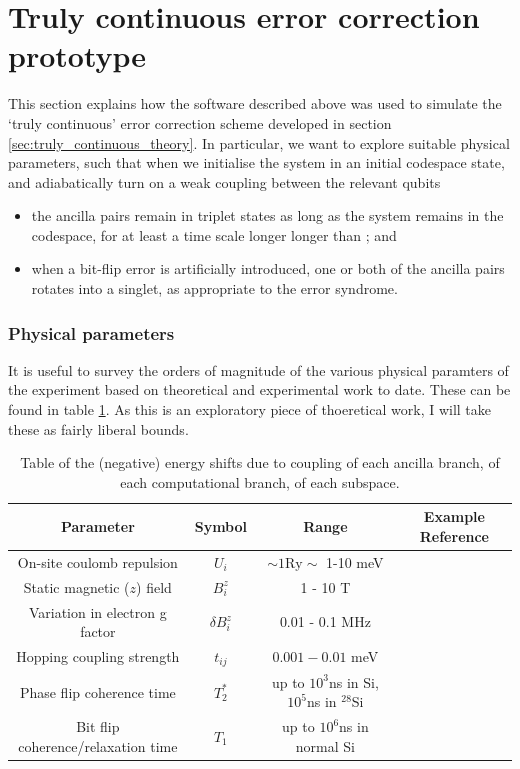 \documentclass{report}
\begin{document}
\section{Truly continuous error correction prototype}
This section explains how the software described above was used to simulate the `truly continuous' error correction scheme developed in section \ref{sec:truly_continuous_theory}. In particular, we want to explore suitable physical parameters, such that when we initialise the system in an initial codespace state, and adiabatically turn on a weak coupling between the relevant qubits
\begin{itemize}
    \item the ancilla pairs remain in triplet states as long as the system remains in the codespace, for at least a time scale longer longer than ; and
    \item when a bit-flip error is artificially introduced, one or both of the ancilla pairs rotates into a singlet, as appropriate to the error syndrome.
\end{itemize}

\subsubsection{Physical parameters}
It is useful to survey the orders of magnitude of the various physical paramters of the experiment based on theoretical and experimental work to date. These can be found in table \ref{table:parameters}. As this is an exploratory piece of thoeretical work, I will take these as fairly liberal bounds.

\begin{table}
    \centering
\begin{tabular}{|c|c|c|c|}
    \hline
    Parameter & Symbol & Range & Example Reference\\
    \hline
    On-site coulomb repulsion & $U_i$ & $\sim 1\mathrm{Ry} \sim$ 1-10 \unit{\milli\electronvolt} & \cite{Shim2022}\\
    \hline 
    Static magnetic ($z$) field & $B_i^z$ & 1 - 10 \unit{\tesla} & \cite{Jock2018} \\
    \hline
    Variation in electron g factor & $\delta B_i^z$ &0.01 - 0.1 \unit{\mega\hertz} &\cite{Hwang2017} \\
    \hline
    Hopping coupling strength & $t_{ij}$ &$0.001 - 0.01$ \unit{\milli\electronvolt} & \cite{Veldhorst2015} \\
    \hline
    Phase flip coherence time &$ T_2^*$ & up to $10^3$\unit{\nano\second} in Si, $10^5$\unit{\nano\second} in $^{28}$Si & \cite{Loss2022}\\
    \hline
    Bit flip coherence/relaxation time &$T_1$&up to $10^6$\unit{\nano\second} in normal Si& \cite{Loss2022}\\
    \hline

\end{tabular}
\caption{Table of the (negative) energy shifts due to coupling of each ancilla branch, of each computational branch, of each subspace.}\label{table:parameters}
\end{table}
\end{document}
